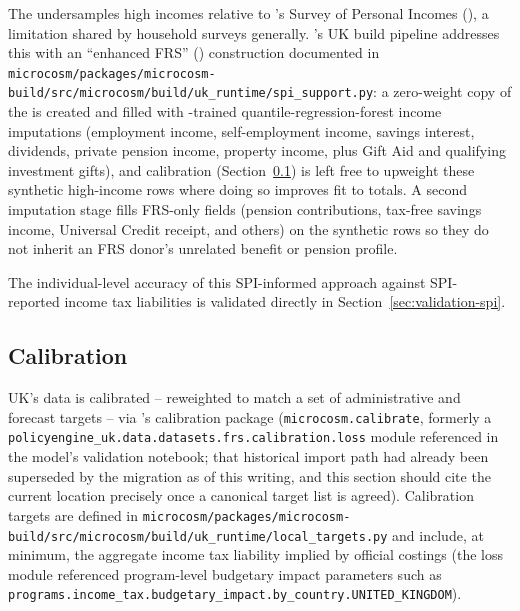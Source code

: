 The \frs{} undersamples high incomes relative to \hmrc{}'s Survey of
Personal Incomes (\spi{}), a limitation shared by household surveys
generally. \microcosm{}'s UK build pipeline addresses this with an
``enhanced FRS'' (\efrs{}) construction documented in
\texttt{microcosm/packages/microcosm-build/src/microcosm/build/uk\_runtime/spi\_support.py}:
a zero-weight copy of the \frs{} is created and filled with \spi{}-trained
quantile-regression-forest income imputations (employment income,
self-employment income, savings interest, dividends, private pension
income, property income, plus Gift Aid and qualifying investment gifts),
and calibration (Section~\ref{sec:data-calibration}) is left free to
upweight these synthetic high-income rows where doing so improves fit to
\spi{} totals. A second imputation stage fills FRS-only fields (pension
contributions, tax-free savings income, Universal Credit receipt, and
others) on the synthetic rows so they do not inherit an FRS donor's
unrelated benefit or pension profile. 

The individual-level accuracy of this SPI-informed approach against SPI-
reported income tax liabilities is validated directly in
Section~\ref{sec:validation-spi}.

\subsection{Calibration}
\label{sec:data-calibration}

\policyengine{} UK's data is calibrated -- reweighted to match a set of
administrative and forecast targets -- via \microcosm{}'s calibration
package (\texttt{microcosm.calibrate}, formerly a
\texttt{policyengine\_uk.data.datasets.frs.calibration.loss} module
referenced in the model's validation notebook; that historical import path
had already been superseded by the \microcosm{} migration as of this
writing, and this section should cite the current location precisely once a
canonical target list is agreed). Calibration targets are defined in
\texttt{microcosm/packages/microcosm-build/src/microcosm/build/uk\_runtime/local\_targets.py}
and include, at minimum, the aggregate income tax liability implied by
official \obr{} costings (the loss module referenced program-level budgetary
impact parameters such as
\texttt{programs.income\_tax.budgetary\_impact.by\_country.UNITED\_KINGDOM}).

